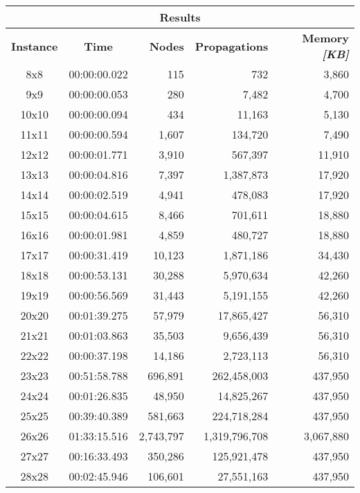 
\begin{center}
    \begin{tabular}{|c|c|r|r|r|}
        \hline
        \multicolumn{5}{|c|}{\textbf{Results}} \\
        \hline
        \textbf{Instance} & \textbf{Time} & \textbf{Nodes} & \textbf{Propagations} & \textbf{Memory \textit{[KB]}} \\
        
        \hline
		8x8 & 00:00:00.022 & 115 & 732 & 3,860 \\ \hline
		9x9 & 00:00:00.053 & 280 & 7,482 & 4,700 \\ \hline
		10x10 & 00:00:00.094 & 434 & 11,163 & 5,130 \\ \hline
		11x11 & 00:00:00.594 & 1,607 & 134,720 & 7,490 \\ \hline
		12x12 & 00:00:01.771 & 3,910 & 567,397 & 11,910 \\ \hline
		13x13 & 00:00:04.816 & 7,397 & 1,387,873 & 17,920 \\ \hline
		14x14 & 00:00:02.519 & 4,941 & 478,083 & 17,920 \\ \hline
		15x15 & 00:00:04.615 & 8,466 & 701,611 & 18,880 \\ \hline
		16x16 & 00:00:01.981 & 4,859 & 480,727 & 18,880 \\ \hline
		17x17 & 00:00:31.419 & 10,123 & 1,871,186 & 34,430 \\ \hline
		18x18 & 00:00:53.131 & 30,288 & 5,970,634 & 42,260 \\ \hline
		19x19 & 00:00:56.569 & 31,443 & 5,191,155 & 42,260 \\ \hline
		20x20 & 00:01:39.275 & 57,979 & 17,865,427 & 56,310 \\ \hline
		21x21 & 00:01:03.863 & 35,503 & 9,656,439 & 56,310 \\ \hline
		22x22 & 00:00:37.198 & 14,186 & 2,723,113 & 56,310 \\ \hline
		23x23 & 00:51:58.788 & 696,891 & 262,458,003 & 437,950 \\ \hline
		24x24 & 00:01:26.835 & 48,950 & 14,825,267 & 437,950 \\ \hline
		25x25 & 00:39:40.389 & 581,663 & 224,718,284 & 437,950 \\ \hline
		26x26 & 01:33:15.516 & 2,743,797 & 1,319,796,708 & 3,067,880 \\ \hline
		27x27 & 00:16:33.493 & 350,286 & 125,921,478 & 437,950 \\ \hline
		28x28 & 00:02:45.946 & 106,601 & 27,551,163 & 437,950 \\ \hline

\end{tabular}
\end{center}
